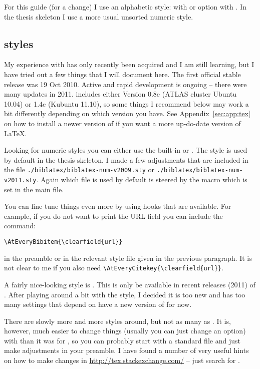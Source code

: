 For this guide (for a change) I use an alphabetic style:
 with \BibTeX{} or option  with
. In the thesis skeleton I use a more usual unsorted
numeric style.


\subsection{ styles}
\label{sec:ref:bbx}

My experience with  has only recently been acquired and I
am still learning, but I have tried out a few things that I will
document here. The first official stable release was 19 Oct
2010. Active and rapid development is ongoing -- there were many
updates in 2011.   includes either Version 0.8e (ATLAS
cluster Ubuntu 10.04) or 1.4c (Kubuntu 11.10), so some things I
recommend below may work a bit differently depending on which version
you have. See Appendix~\ref{sec:app:tex} on how to install a newer
version of \TeXLive if you want a more up-do-date version of \LaTeX.

Looking for numeric styles you can either use the built-in
 or .  The 
style is used by default in the thesis skeleton. I made a few
adjustments that are included in the file
\texttt{./biblatex/biblatex-num-v2009.sty} or
\texttt{./biblatex/biblatex-num-v2011.sty}. Again which file is used
by default is steered by the  macro which is set in the
main file.

You can fine tune things even more by using hooks that are
available. For example, if you do not want to print the URL field you
can include the command:
\begin{verbatim}
\AtEveryBibitem{\clearfield{url}}
\end{verbatim}
in the preamble or in the relevant style file given in the previous
paragraph. It is not clear to me if you also need
\verb+\AtEveryCitekey{\clearfield{url}}+.

A fairly nice-looking style is . This is only be
available in recent releases (2011) of \TeXLive. After playing
around a bit with the  style, I decided it is too new and
has too many settings that depend on have a new version of 
for now.

There are slowly more and more  styles around, but
not as many as \BibTeX. It is, however, much easier to change things
(usually you can just change an option) with  than it
was for \BibTeX, so you can probably start with a standard file and
just make adjustments in your preamble. I have found a number of very
useful hints on how to make changes in
\url{http://tex.stackexchange.com/} -- just search for .

